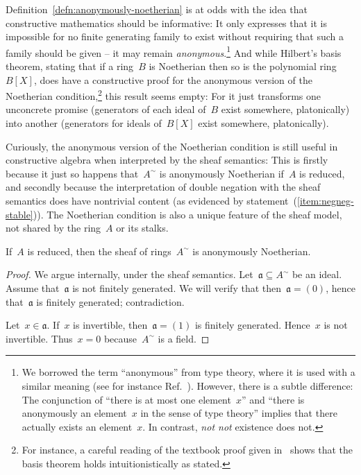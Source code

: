 \documentclass{ws-rv9x6}
\newcommand{\aaa}{\mathfrak{a}}
\renewcommand{\_}{\mathpunct{.}}
\newcommand{\?}{\,{:}\,}
\newcommand{\notnot}{\emph{not not}\xspace}
\begin{document}
Definition~\ref{defn:anonymously-noetherian} is at odds with the idea that constructive mathematics should
be informative: It only expresses that it is impossible for no finite
generating family to exist without requiring that such a family should be given
-- it may remain \emph{anonymous}.\footnote{We borrowed the term ``anonymous''
from type theory, where it is used with a similar meaning (see for instance
Ref.~). However, there is a
subtle difference: The conjunction of ``there is at most one element~$x$'' and
``there is anonymously an element~$x$ in the sense of type theory'' implies
that there actually exists an element~$x$. In contrast, \notnot existence does
not.} And while Hilbert's basis theorem, stating that if a ring~$B$ is
Noetherian then so is the polynomial ring~$B[X]$, does have a constructive
proof for the anonymous version of the Noetherian condition,\footnote{For
instance, a careful reading of the textbook proof given
in~\cite[Theorem~7.5]{atiyah-macdonald:commutative-algebra} shows that the
basis theorem holds intuitionistically as stated.} this result seems empty: For
it just transforms one unconcrete promise (generators of each ideal of~$B$
exist somewhere, platonically) into another (generators for ideals of~$B[X]$
exist somewhere, platonically).

Curiously, the anonymous version of the Noetherian condition is still useful in
constructive algebra when interpreted by the sheaf semantics: This is firstly
because it just so happens that~$A^\sim$ is anonymously Noetherian if~$A$ is reduced,
and secondly because the interpretation of double negation with the sheaf
semantics does have nontrivial content (as evidenced by
statement~(\ref{item:negneg-stable})). The Noetherian condition is also a
unique feature of the sheaf model, not shared by the ring~$A$ or its stalks.

\begin{proposition}\label{prop:anon-noeth}
If~$A$ is reduced, then the sheaf of rings~$A^\sim$ is anonymously
Noetherian.\end{proposition}

\begin{proof}We argue internally, under the sheaf semantics. Let~$\aaa \subseteq A^\sim$ be an ideal.
Assume that~$\aaa$ is not finitely generated. We will verify that then~$\aaa =
(0)$, hence that~$\aaa$ is finitely generated; contradiction.

Let~$x \in \aaa$. If~$x$ is invertible, then~$\aaa = (1)$ is finitely
generated. Hence~$x$ is not invertible. Thus~$x = 0$ because~$A^\sim$ is a
field.
\end{proof}
\end{document}
